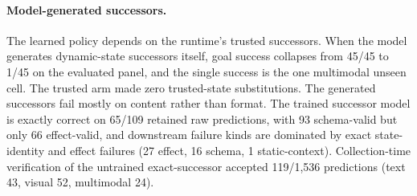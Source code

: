\paragraph{Model-generated successors.} The learned policy depends on the runtime's trusted successors. When the model generates dynamic-state successors itself, goal success collapses from 45/45 to 1/45 on the evaluated panel, and the single success is the one multimodal unseen cell. The trusted arm made zero trusted-state substitutions. The generated successors fail mostly on content rather than format. The trained successor model is exactly correct on 65/109 retained raw predictions, with 93 schema-valid but only 66 effect-valid, and downstream failure kinds are dominated by exact state-identity and effect failures (27 effect, 16 schema, 1 static-context). Collection-time verification of the untrained exact-successor accepted 119/1,536 predictions (text 43, visual 52, multimodal 24).


